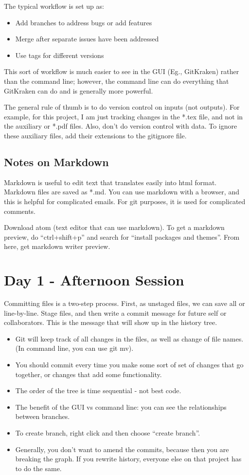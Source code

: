 \documentclass[12pt]{article}
\begin{document}
The typical workflow is set up as:
\begin{itemize}
  \item Add branches to address bugs or add features
  \item Merge after separate issues have been addressed
  \item Use tags for different versions
\end{itemize}

This sort of workflow is much easier to see in the GUI (Eg., GitKraken) rather than the command line; however, the command line can do everything that GitKraken can do and is generally more powerful.

The general rule of thumb is to do version control on inputs (not outputs). For example, for this project, I am just tracking changes in the *.tex file, and not in the auxiliary or *.pdf files. Also, don't do version control with data. To ignore these auxiliary files, add their extensions to the gitignore file.

\subsection{Notes on Markdown}
Markdown is useful to edit text that translates easily into html format. Markdown files are saved as *.md. You can use markdown with a browser, and this is helpful for complicated emails. For git purposes, it is used for complicated comments.

Download atom (text editor that can use markdown). To get a markdown preview, do ``ctrl+shift+p'' and search for ``install packages and themes''. From here, get markdown writer preview.

\section{Day 1 - Afternoon Session}
Committing files is a two-step process. First, as unstaged files, we can save all or line-by-line. Stage files, and then write a commit message for future self or collaborators. This is the message that will show up in the history tree.
\begin{itemize}
\item Git will keep track of all changes in the files, as well as change of file names. (In command line, you can use git mv).

\item You should commit every time you make some sort of set of changes that go together, or changes that add some functionality.
\item The order of the tree is time sequential - not best code.
\item The benefit of the GUI vs command line: you can see the relationships between branches. 
\item To create branch, right click and then choose ``create branch''.
\item Generally, you don't want to amend the commits, because then you are breaking the graph. If you rewrite history, everyone else on that project has to do the same.
\end{itemize}
\end{document}
